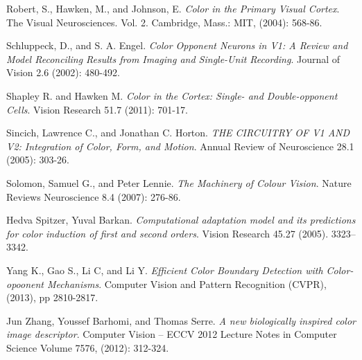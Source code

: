 \documentclass[journal,onecolumn]{IEEEtran}
\begin{document}
\begin{thebibliography}{1}
    Robert, S., Hawken, M., and Johnson, E.
    \emph{Color in the Primary Visual Cortex}.
    The Visual Neurosciences. Vol. 2.
    Cambridge, Mass.: MIT, (2004): 568-86.

    Schluppeck, D., and S. A. Engel.
    \emph{Color Opponent Neurons in V1: A Review and Model Reconciling Results from Imaging and Single-Unit Recording}.
    Journal of Vision 2.6 (2002): 480-492.

    Shapley R. and Hawken M.
    \emph{Color in the Cortex: Single- and Double-opponent Cells}.
    Vision Research 51.7 (2011): 701-17.

    Sincich, Lawrence C., and Jonathan C. Horton.
    \emph{THE CIRCUITRY OF V1 AND V2: Integration of Color, Form, and Motion}.
    Annual Review of Neuroscience 28.1 (2005): 303-26.
    
    Solomon, Samuel G., and Peter Lennie.
    \emph{The Machinery of Colour Vision}.
    Nature Reviews Neuroscience 8.4 (2007): 276-86.

    Hedva Spitzer, Yuval Barkan.
    \emph{Computational adaptation model and its predictions for color induction of first and second orders}.
    Vision Research 45.27 (2005). 3323–3342.

    Yang K., Gao S., Li C, and Li Y.
    \emph{Efficient Color Boundary Detection with Color-opoonent Mechanisms}.
    Computer Vision and Pattern Recognition (CVPR), (2013), pp 2810-2817.

    Jun Zhang, Youssef Barhomi, and Thomas Serre.
    \emph{A new biologically inspired color image descriptor}.
    Computer Vision – ECCV 2012
    Lecture Notes in Computer Science Volume 7576, (2012): 312-324.

\end{thebibliography}

\newpage
\end{document}
